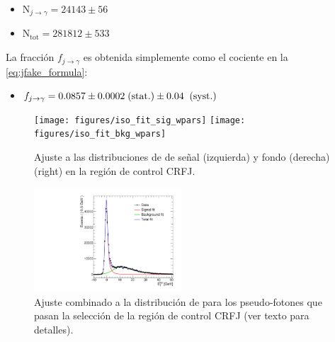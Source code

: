 \begin{itemize}
\item[] N$_{j\to\gamma}= 24143 \pm 56$

\item[] N$_\text{tot}= 281812 \pm 533$
\end{itemize}

La fracción $f_{j\to \gamma}$ es obtenida simplemente como el cociente
en la \cref{eq:jfake_formula}:

\begin{itemize}
\item[] $f_{j\rightarrow\gamma} = 0.0857 \pm 0.0002 \mbox{$\;$(stat.)} \pm 0.04 \;\mbox{$\;$(syst.)}$
\end{itemize}

\begin{figure}[!htbp]
  \centering

  \texttt{[image: figures/iso\_fit\_sig\_wpars]}  \hfill
  \texttt{[image: figures/iso\_fit\_bkg\_wpars]}

  \caption{Ajuste a las distribuciones de {\etiso} de señal
    (izquierda) y fondo (derecha) (right) en la región
    de control CRFJ.}
  \label{fig:jetfake_sigbkg}

\end{figure}

\begin{figure}[!htbp]
  \centering

  \includegraphics[width=0.49\textwidth]{figures/iso_fit_sarange}

  \caption{Ajuste combinado a la distribución de {\etiso}
    para los pseudo-fotones que pasan la selección de la región
    de control CRFJ (ver texto para detalles).}
  \label{fig:jetfake_combfit}

\end{figure}


